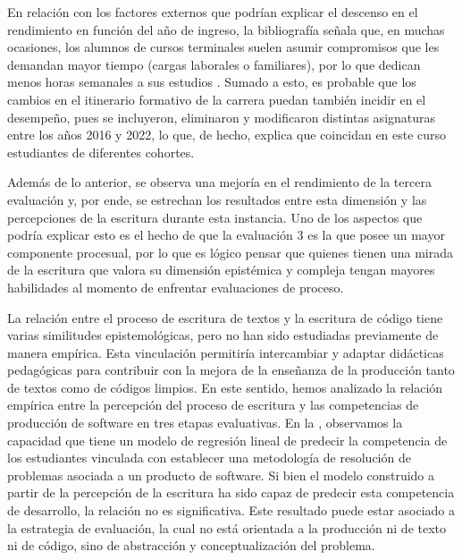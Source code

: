\documentclass[spanish]{textolivre}
\begin{document}
En relación con los factores externos que podrían explicar el descenso en el rendimiento en función del año de ingreso, la bibliografía señala que, en muchas ocasiones, los alumnos de cursos terminales suelen asumir compromisos que les demandan mayor tiempo (cargas laborales o familiares), por lo que dedican menos horas semanales a sus estudios \cite{alcover2007analisis, xavier2022persistence}. Sumado a esto, es probable que los cambios en el itinerario formativo de la carrera puedan también incidir en el desempeño, pues se incluyeron, eliminaron y modificaron distintas asignaturas entre los años 2016 y 2022, lo que, de hecho, explica que coincidan en este curso estudiantes de diferentes cohortes.

Además de lo anterior, se observa una mejoría en el rendimiento de la tercera evaluación y, por ende, se estrechan los resultados entre esta dimensión y las percepciones de la escritura durante esta instancia. Uno de los aspectos que podría explicar esto es el hecho de que la evaluación 3 es la que posee un mayor componente procesual, por lo que es lógico pensar que quienes tienen una mirada de la escritura que valora su dimensión  epistémica y compleja tengan mayores habilidades al momento de enfrentar evaluaciones de proceso.  

La relación entre el proceso de escritura de textos y la escritura de código tiene varias similitudes epistemológicas, pero no han sido estudiadas previamente de manera empírica. Esta vinculación permitiría intercambiar y adaptar didácticas pedagógicas para contribuir con la mejora de la enseñanza de la producción tanto de textos como de códigos limpios. En este sentido, hemos analizado la relación empírica entre la percepción del proceso de escritura y las competencias de producción de software en tres etapas evaluativas. En la , observamos la capacidad que tiene un modelo de regresión lineal de predecir la competencia de los estudiantes vinculada con establecer una metodología de resolución de problemas asociada a un producto de software. Si bien el modelo construido a partir de la percepción de la escritura ha sido capaz de predecir esta competencia de desarrollo, la relación no es significativa. Este resultado puede estar asociado a la estrategia de evaluación, la cual no está orientada a la producción ni de texto ni de código, sino de abstracción y conceptualización del problema.
\end{document}
